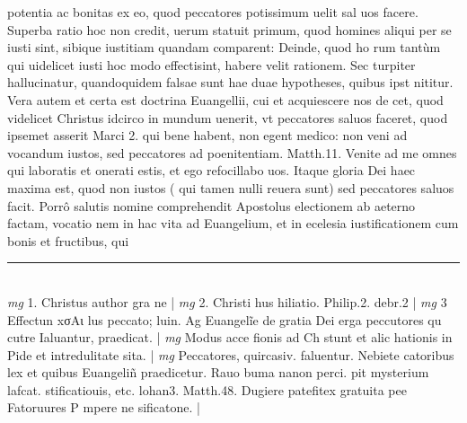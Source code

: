 \documentclass{article}
\begin{document}
\begin{pages}
potentia ac bonitas ex eo, quod peccatores potissimum uelit sal uos facere. Superba ratio hoc non credit, uerum statuit primum, quod homines aliqui per se iusti sint, sibique iustitiam quandam comparent: Deinde, quod ho rum tantùm qui uidelicet iusti hoc modo effectisint, habere velit rationem. Sec turpiter hallucinatur, quandoquidem falsae sunt hae duae hypotheses, quibus ipst nititur. Vera autem et certa est doctrina Euangellii, cui et acquiescere nos de cet, quod videlicet Christus idcirco in mundum uenerit, vt peccatores saluos faceret, quod ipsemet asserit Marci 2. qui bene habent, non egent medico: non veni ad vocandum iustos, sed peccatores ad poenitentiam. Matth.11. Venite ad me omnes qui laboratis et onerati estis, et ego refocillabo uos. Itaque gloria Dei haec maxima est, quod non iustos ( qui tamen nulli reuera sunt) sed peccatores saluos facit.  \pend\pstart Porrô salutis nomine comprehendit Apostolus electionem ab aeterno factam, vocatio nem in hac vita ad Euangelium, et in ecelesia iustificationem cum bonis et fructibus, qui  \pend
\vspace{0.5cm}\noindent
\vspace{0.2cm}\rule{1cm}{0.2pt}\\ 
\hspace{0.2cm}\textit{mg}
\footnotesize 1. Christus author gra ne 
\normalsize| 
\hspace{0.2cm}\textit{mg}
\footnotesize 2. Christi hus hiliatio. Philip.2. debr.2 
\normalsize| 
\hspace{0.2cm}\textit{mg}
\footnotesize 3 Effectun xσAι lus peccato; luin. Ag Euangelĩe de gratia Dei erga peccutores qu cutre Ialuantur, praedicat. 
\normalsize| 
\hspace{0.2cm}\textit{mg}
\footnotesize Modus acce fionis ad Ch stunt et alic hationis in Pide et intredulitate sita. 
\normalsize| 
\hspace{0.2cm}\textit{mg}
\footnotesize Peccatores, quircasiv. faluentur. Nebiete catoribus lex et quibus Euangeliñ praedicetur. Rauo buma nanon perci. pit mysterium lafcat. stificatiouis, etc. lohan3. Matth.48. Dugiere patefitex gratuita pee Fatoruures P mpere ne sificatone. 
\normalsize| 

\end{pages}
\end{document}
